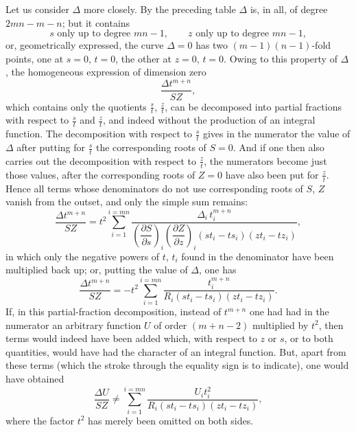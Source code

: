\documentclass[10pt]{article}
\begin{document}
Let us consider $\Delta$ more closely. By the preceding table $\Delta$ is, in all, of degree $2mn-m-n$; but it contains
\[
s\text{ only up to degree }mn-1,
\qquad
z\text{ only up to degree }mn-1,
\]
or, geometrically expressed, the curve $\Delta=0$ has two $(m-1)(n-1)$-fold points, one at $s=0$, $t=0$, the other at $z=0$, $t=0$. Owing to this property of $\Delta$, the homogeneous expression of dimension zero
\[
\frac{\Delta t^{m+n}}{SZ},
\]
which contains only the quotients $\frac{s}{t}$, $\frac{z}{t}$, can be decomposed into partial fractions with respect to $\frac{s}{t}$ and $\frac{z}{t}$, and indeed without the production of an integral function. The decomposition with respect to $\frac{s}{t}$ gives in the numerator the value of $\Delta$ after putting for $\frac{s}{t}$ the corresponding roots of $S=0$. And if one then also carries out the decomposition with respect to $\frac{z}{t}$, the numerators become just those values, after the corresponding roots of $Z=0$ have also been put for $\frac{z}{t}$. Hence all terms whose denominators do not use corresponding roots of $S$, $Z$ vanish from the outset, and only the simple sum remains:
\[
\frac{\Delta t^{m+n}}{SZ}
=t^2\sum_{i=1}^{i=mn}
\frac{\Delta_i\,t_i^{m+n}}
{\left(\dfrac{\partial S}{\partial s}\right)_i\left(\dfrac{\partial Z}{\partial z}\right)_i(st_i-ts_i)(zt_i-tz_i)},
\]
in which only the negative powers of $t$, $t_i$ found in the denominator have been multiplied back up; or, putting the value of $\Delta$, one has
\[
\frac{\Delta t^{m+n}}{SZ}
=-t^2\sum_{i=1}^{i=mn}
\frac{t_i^{m+n}}{R_i(st_i-ts_i)(zt_i-tz_i)}.
\]
If, in this partial-fraction decomposition, instead of $t^{m+n}$ one had had in the numerator an arbitrary function $U$ of order $(m+n-2)$ multiplied by $t^2$, then terms would indeed have been added which, with respect to $z$ or $s$, or to both quantities, would have had the character of an integral function. But, apart from these terms (which the stroke through the equality sign is to indicate), one would have obtained
\[
\frac{\Delta U}{SZ}\not=
\sum_{i=1}^{i=mn}
\frac{U_i t_i^2}{R_i(st_i-ts_i)(zt_i-tz_i)},
\]
where the factor $t^2$ has merely been omitted on both sides.
\end{document}
